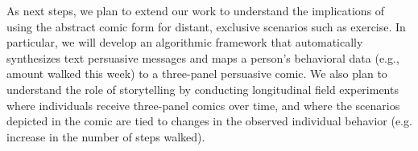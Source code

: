As next steps, we plan to extend our work to understand the implications of using the abstract comic form for distant, exclusive scenarios such as exercise. In particular, we will develop an algorithmic framework that automatically synthesizes text persuasive messages and maps a person's behavioral data (e.g., amount walked this week) to a three-panel persuasive comic. We also plan to understand the role of storytelling by conducting longitudinal field experiments where individuals receive three-panel comics over time, and where the scenarios depicted in the comic are tied to changes in the observed individual behavior (e.g. increase in the number of steps walked). 






